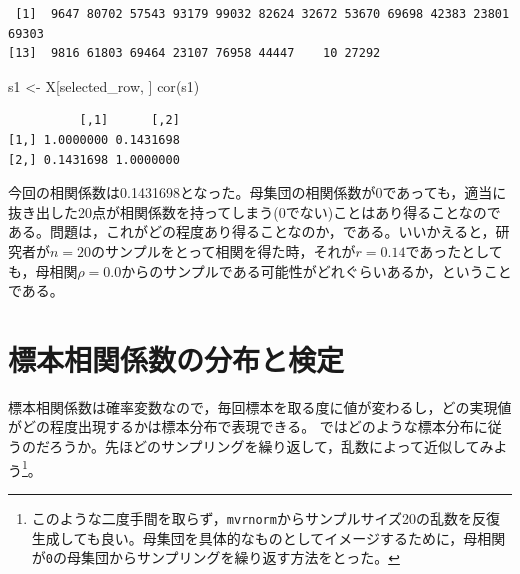 \documentclass[
  a4paper,
]{ltjsbook}
\newenvironment{Shaded}{\begin{snugshade}}{\end{snugshade}}
\newcommand{\FunctionTok}[1]{\textcolor[rgb]{0.28,0.35,0.67}{#1}}
\newcommand{\NormalTok}[1]{\textcolor[rgb]{0.00,0.23,0.31}{#1}}
\newcommand{\OtherTok}[1]{\textcolor[rgb]{0.00,0.23,0.31}{#1}}
\begin{document}
\begin{verbatim}
 [1]  9647 80702 57543 93179 99032 82624 32672 53670 69698 42383 23801 69303
[13]  9816 61803 69464 23107 76958 44447    10 27292
\end{verbatim}

\begin{Shaded}
\begin{Highlighting}[]
\NormalTok{s1 }\OtherTok{\textless{}{-}}\NormalTok{ X[selected\_row, ]}
\FunctionTok{cor}\NormalTok{(s1)}
\end{Highlighting}
\end{Shaded}

\begin{verbatim}
          [,1]      [,2]
[1,] 1.0000000 0.1431698
[2,] 0.1431698 1.0000000
\end{verbatim}

今回の相関係数は0.1431698となった。母集団の相関係数が0であっても，適当に抜き出した20点が相関係数を持ってしまう(0でない)ことはあり得ることなのである。問題は，これがどの程度あり得ることなのか，である。いいかえると，研究者が\(n=20\)のサンプルをとって相関を得た時，それが\(r = 0.14\)であったとしても，母相関\(\rho = 0.0\)からのサンプルである可能性がどれぐらいあるか，ということである。

\section{標本相関係数の分布と検定}\label{ux6a19ux672cux76f8ux95a2ux4fc2ux6570ux306eux5206ux5e03ux3068ux691cux5b9a}

標本相関係数は確率変数なので，毎回標本を取る度に値が変わるし，どの実現値がどの程度出現するかは標本分布で表現できる。
ではどのような標本分布に従うのだろうか。先ほどのサンプリングを繰り返して，乱数によって近似してみよう\footnote{このような二度手間を取らず，\texttt{mvrnorm}からサンプルサイズ20の乱数を反復生成しても良い。母集団を具体的なものとしてイメージするために，母相関が\texttt{0}の母集団からサンプリングを繰り返す方法をとった。}。
\end{document}
